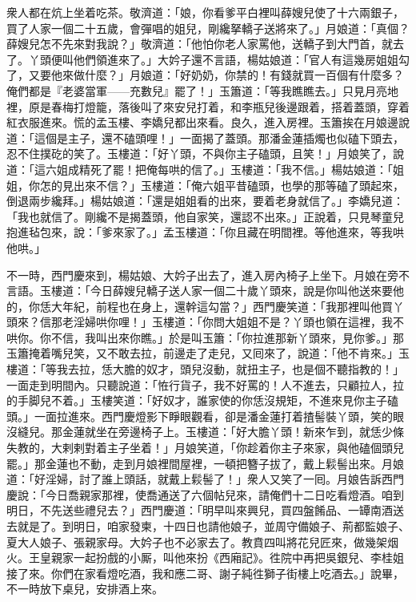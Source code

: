 衆人都在炕上坐着吃茶。敬濟道：「娘，你看爹平白裡叫薛嫂兒使了十六兩銀子，買了人家一個二十五歲，會彈唱的姐兒，剛纔拏轎子送將來了。」月娘道：「真個？薛嫂兒怎不先來對我說？」敬濟道：「他怕你老人家罵他，送轎子到大門首，就去了。丫頭便叫他們領進來了。」大妗子還不言語，楊姑娘道：「官人有這幾房姐姐勾了，又要他來做什麼？」月娘道：「好奶奶，你禁的！有錢就買一百個有什麼多？俺們都是『老婆當軍——充數兒』罷了！」{}玉簫道：「等我瞧瞧去。」只見月亮地裡，原是春梅打燈籠，落後叫了來安兒打着，和李瓶兒後邊跟着，搭着蓋頭，穿着紅衣服進來。慌的孟玉樓、李嬌兒都出來看。{}良久，進入房裡。玉簫挨在月娘邊說道：「這個是主子，還不磕頭哩！」一面揭了蓋頭。那潘金蓮插燭也似磕下頭去，忍不住撲矻的笑了。玉樓道：「好丫頭，不與你主子磕頭，且笑！」月娘笑了，說道：「這六姐成精死了罷！把俺每哄的信了。」玉樓道：「我不信。」{}楊姑娘道：「姐姐，你怎的見出來不信？」玉樓道：「俺六姐平昔磕頭，也學的那等磕了頭起來，倒退兩步纔拜。」楊姑娘道：「還是姐姐看的出來，要着老身就信了。」李嬌兒道：「我也就信了。剛纔不是揭蓋頭，他自家笑，還認不出來。」{}正說着，只見琴童兒抱進毡包來，說：「爹來家了。」孟玉樓道：「你且藏在明間裡。等他進來，等我哄他哄。」

不一時，西門慶來到，楊姑娘、大妗子出去了，進入房內椅子上坐下。月娘在旁不言語。玉樓道：「今日薛嫂兒轎子送人家一個二十歲丫頭來，說是你叫他送來要他的，你恁大年紀，前程也在身上，還幹這勾當？」西門慶笑道：「我那裡叫他買丫頭來？信那老淫婦哄你哩！」玉樓道：「你問大姐姐不是？丫頭也領在這裡，我不哄你。你不信，我叫出來你瞧。」於是叫玉簫：「你拉進那新丫頭來，見你爹。」那玉簫掩着嘴兒笑，又不敢去拉，前邊走了走兒，又囘來了，說道：「他不肯來。」玉樓道：「等我去拉，恁大膽的奴才，頭兒沒動，就扭主子，也是個不聽指教的！」一面走到明間內。只聽說道：「恠行貨子，我不好罵的！人不進去，只顧拉人，拉的手脚兒不着。」玉樓笑道：「好奴才，誰家使的你恁沒規矩，不進來見你主子磕頭。」一面拉進來。西門慶燈影下睜眼觀看，卻是潘金蓮打着揸髻裝丫頭，笑的眼沒縫兒。{}那金蓮就坐在旁邊椅子上。玉樓道：「好大膽丫頭！新來乍到，就恁少條失教的，大剌剌對着主子坐着！」月娘笑道，「你趁着你主子來家，與他磕個頭兒罷。」那金蓮也不動，走到月娘裡間屋裡，一頓把簪子拔了，戴上鬏髻出來。月娘道：「好淫婦，討了誰上頭話，就戴上鬏髻了！」衆人又笑了一囘。月娘告訴西門慶說：「今日喬親家那裡，使喬通送了六個帖兒來，請俺們十二日吃看燈酒。咱到明日，不先送些禮兒去？」西門慶道：「明早叫來興兒，買四盤餚品、一罈南酒送去就是了。到明日，咱家發柬，十四日也請他娘子，並周守備娘子、荊都監娘子、夏大人娘子、張親家母。大妗子也不必家去了。教賁四叫將花兒匠來，做幾架烟火。王皇親家一起扮戲的小厮，叫他來扮《西廂記》。徃院中再把吳銀兒、李桂姐接了來。你們在家看燈吃酒，我和應二哥、謝子純徃獅子街樓上吃酒去。」說畢，不一時放下桌兒，安排酒上來。

